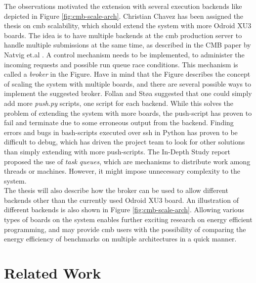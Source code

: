 The observations motivated the extension with several execution backends like depicted in Figure \ref{fig:cmb-scale-arch}. Christian Chavez has been assigned the thesis on \gls{cmb} scalability, which should extend the system with more Odroid XU3 boards. The idea is to have multiple backends at the \gls{cmb} production server to handle multiple submissions at the same time, as described in the CMB paper by Natvig et.al \cite{a:CMB}. A control mechanism needs to be implemented, to administer the incoming requests and possible run queue race conditions. This mechanism is called a \textit{broker} in the Figure. Have in mind that the Figure describes the concept of scaling the system with multiple boards, and there are several possible ways to implement the suggested broker. Follan and Støa suggested that one could simply add more \textit{push.py} scripts, one script for each backend. While this solves the problem of extending the system with more boards, the push-script has proven to fail and terminate due to some erroneous output from the backend. Finding errors and bugs in bash-scripts executed over \gls{ssh} in Python has proven to be difficult to debug, which has driven the project team to look for other solutions than simply extending with more push-scripts. The In-Depth Study report proposed the use of \textit{task queues}, which are mechanisms to distribute work among threads or machines. However, it might impose unnecessary complexity to the system.  \\

The thesis will also describe how the broker can be used to allow different backends other than the currently used Odroid XU3 board. An illustration of different backends is also shown in Figure \ref{fig:cmb-scale-arch}. Allowing various types of boards on the system enables further exciting research on energy efficient programming, and may provide \gls{cmb} users with the possibility of comparing the energy efficiency of benchmarks on multiple architectures in a quick manner.

\section{Related Work}
\label{sec:related}


